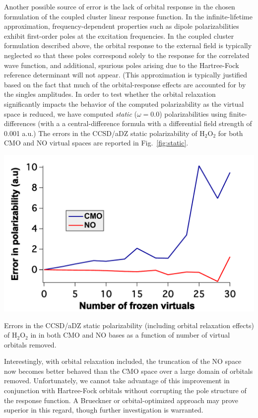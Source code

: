 Another possible source of error is the lack of orbital response in the chosen
formulation of the coupled cluster linear response function.\cite{Koch94:BCC}
In the infinite-lifetime approximation, frequency-dependent properties such as
dipole polarizabilities exhibit first-order poles at the excitation
frequencies.  In the coupled cluster formulation described above, the orbital
response to the external field is typically neglected so that these poles
correspond solely to the response for the correlated wave function, and
additional, spurious poles arising due to the Hartree-Fock reference
determinant will not appear.  (This approximation is typically justified based
on the fact that much of the orbital-response effects are accounted for by the
singles amplitudes\cite{Christiansen95:CC2}.  In order to test whether the
orbital relaxation significantly impacts the behavior of the computed
polarizability as the virtual space is reduced, we have computed {\em static}
($\omega = 0.0$) polarizabilities using finite-differences (with a a
central-difference formula with a differential field strength of 0.001 a.u.)
The errors in the CCSD/aDZ static polarizability of H$_2$O$_2$ for both CMO
and NO virtual spaces are reported in Fig.~\ref{fig:static}.  
\begin{MyFigure}[h!]
\centering
\includegraphics[width=0.6\linewidth,natwidth=610,natheight=642]{figures_fvno/polar_static.pdf}
\caption{{\footnotesize Errors in the CCSD/aDZ static polarizability
(including orbital relaxation effects) of H$_2$O$_2$ in
in both CMO and NO bases as a function of number of virtual orbitals
removed.}}
\label{fig:static}
\end{MyFigure}
Interestingly, with orbital relaxation included, the truncation of the NO space now becomes
better behaved than the CMO space over a large domain of orbitals removed.
Unfortunately, we cannot take advantage of this improvement in conjunction
with Hartree-Fock orbitals without corrupting the pole structure of the
response function.  A Brueckner or orbital-optimized approach may prove
superior in this regard, though further investigation is
warranted.\cite{Koch94:BCC,Pedersen01}

